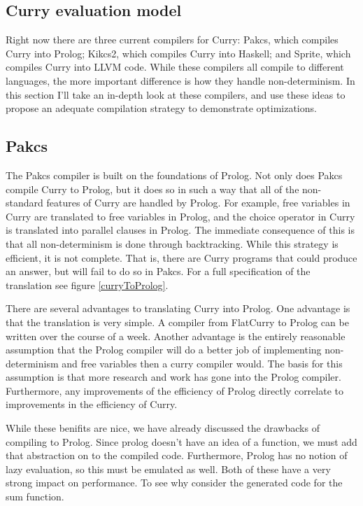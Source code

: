 
\subsection{Curry evaluation model}

Right now there are three current compilers for Curry:
Pakcs, which compiles Curry into Prolog;
Kikcs2, which compiles Curry into Haskell;
and Sprite, which compiles Curry into LLVM code.
While these compilers all compile to different languages,
the more important difference is how they handle non-determinism.
In this section I'll take an in-depth look at these compilers,
and use these ideas to propose an adequate compilation strategy
to demonstrate optimizations.

\subsection{Pakcs}

The Pakcs compiler is built on the foundations of Prolog.
Not only does Pakcs compile Curry to Prolog,
but it does so in such a way that all of the non-standard features 
of Curry are handled by Prolog.
For example, free variables in Curry are translated to free variables in Prolog,
and the choice operator in Curry is translated into parallel clauses in Prolog.
The immediate consequence of this is that all non-determinism is done through backtracking.
While this strategy is efficient, it is not complete.
That is, there are Curry programs that could produce an answer, but will fail to do so in Pakcs.
For a full specification of the translation see figure \ref{curryToProlog}.

There are several advantages to translating Curry into Prolog.
One advantage is that the translation is very simple.
A compiler from FlatCurry to Prolog can be written over the course of a week.
Another advantage is the entirely reasonable assumption that the Prolog compiler
will do a better job of implementing non-determinism and free variables then a curry compiler would.
The basis for this assumption is that more research and work has gone into the Prolog compiler.
Furthermore, any improvements of the efficiency of Prolog directly correlate to improvements
in the efficiency of Curry.


While these benifits are nice, we have already discussed the drawbacks of compiling to Prolog.
Since prolog doesn't have an idea of a function, we must add that abstraction on to the compiled code.
Furthermore, Prolog has no notion of lazy evaluation, so this must be emulated as well.
Both of these have a very strong impact on performance.
To see why consider the generated code for the sum function.

